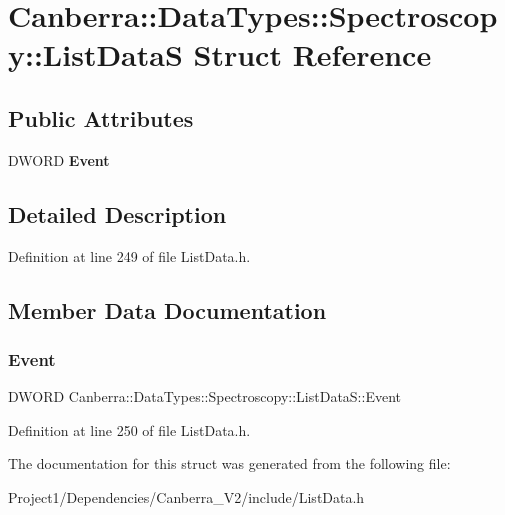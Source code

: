 \hypertarget{struct_canberra_1_1_data_types_1_1_spectroscopy_1_1_list_data_s}{}\section{Canberra\+:\+:Data\+Types\+:\+:Spectroscopy\+:\+:List\+DataS Struct Reference}
\label{struct_canberra_1_1_data_types_1_1_spectroscopy_1_1_list_data_s}
\subsection*{Public Attributes}
\begin{DoxyCompactItemize}
\item 
\mbox{\label{struct_canberra_1_1_data_types_1_1_spectroscopy_1_1_list_data_s_a31964d346aa3da199a694057ea360bbf}} 
D\+W\+O\+RD {\bfseries Event}
\end{DoxyCompactItemize}


\subsection{Detailed Description}


Definition at line 249 of file List\+Data.\+h.



\subsection{Member Data Documentation}
\mbox{\label{struct_canberra_1_1_data_types_1_1_spectroscopy_1_1_list_data_s_a31964d346aa3da199a694057ea360bbf}} 
\subsubsection{\texorpdfstring{Event}{Event}}
{\footnotesize\ttfamily D\+W\+O\+RD Canberra\+::\+Data\+Types\+::\+Spectroscopy\+::\+List\+Data\+S\+::\+Event}



Definition at line 250 of file List\+Data.\+h.



The documentation for this struct was generated from the following file\+:\begin{DoxyCompactItemize}
\item 
Project1/\+Dependencies/\+Canberra\+\_\+\+V2/include/List\+Data.\+h\end{DoxyCompactItemize}
